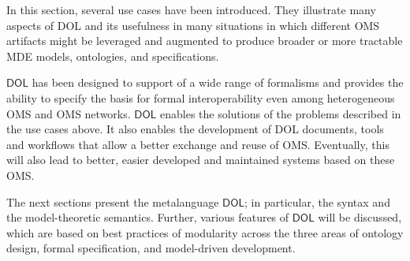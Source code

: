 \documentclass[10pt, a4paper]{isov2}
\newcommand*{\DOL}{\ensuremath{\mathsf{DOL}}\xspace}
\begin{document}


In this section, several use cases have been introduced. They illustrate many aspects of DOL and its usefulness in many situations in which different OMS artifacts might be leveraged and augmented to produce broader or more tractable MDE models, ontologies, and specifications.

 \DOL has been designed to support of a wide range of formalisms and
provides the ability to specify the basis for formal interoperability even among heterogeneous OMS and OMS networks. \DOL enables the solutions of the problems described in the use cases above. It also enables the development of DOL documents, tools and workflows that 
allow  a better exchange and reuse of OMS. Eventually, this will also lead to better, easier developed and maintained systems based on these OMS.

The next sections present the metalanguage \DOL{}; in particular, the syntax and the model-theoretic semantics. Further, various features of \DOL will be discussed, which  are based on  best practices of modularity  across
 the three areas of ontology design, formal 
specification, and model-driven development.


\end{document}
